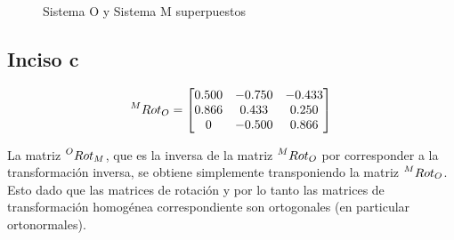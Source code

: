 \documentclass[a4paper,12pt]{article}
\begin{document}
\begin{figure}[H]
    \centering
    \begin{adjustbox}{scale = 0.85, max width=\columnwidth}
    \end{adjustbox}
    \caption{Sistema O y Sistema M superpuestos}
\end{figure}

\subsection{Inciso c}
\begin{equation*}
    \prescript{M}{}{Rot_O} = 
    \begin{bmatrix}
        0.500  &  -0.750  & -0.433 \\
        0.866  &  0.433   & 0.250 \\
        0      & -0.500   & 0.866
    \end{bmatrix}
\end{equation*}

La matriz $\prescript{O}{}{Rot_M}$, que es la inversa de la matriz $\prescript{M}{}{Rot_O}$ por corresponder a la transformación inversa,
se obtiene simplemente transponiendo la matriz $\prescript{M}{}{Rot_O}$. Esto dado que las matrices de rotación y por lo tanto las matrices de 
transformación homogénea correspondiente son ortogonales (en particular ortonormales).
\end{document}
